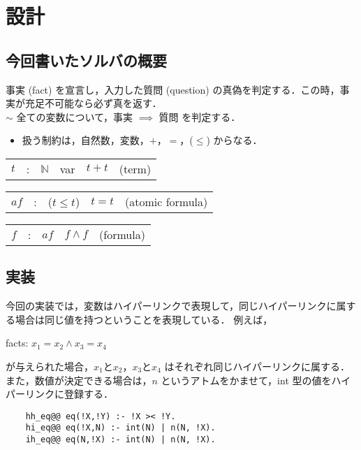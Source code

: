 \chapter{設計}
\section{今回書いたソルバの概要}
事実 (fact) を宣言し，入力した質問 (question) の真偽を判定する．この時，事実が充足不可能なら必ず真を返す．\\
$\sim$  全ての変数について，事実 $\implies$ 質問 を判定する．
\begin{itemize}
    \item 扱う制約は，自然数，変数，$+$，$=$，($\leq$) からなる．
\end{itemize}

\begin{table}[h]
    \centering
    \small
    \begin{tabular}{ccc|c|cr}
        $t$ & : & $\mathbb{N}$ & var & $t + t$ & (term)
    \end{tabular}
\end{table}

\begin{table}[h]
    \centering
    \small
    \begin{tabular}{ccc|cr}
        $af$ & : & ($t \leq t$) & $t=t$ & (atomic formula)
    \end{tabular}
\end{table}

\begin{table}[h]
    \centering
    \small
    \begin{tabular}{ccc|cr}
        $f$ & : & $af$ &$f \wedge f$ & (formula)
    \end{tabular}
\end{table}

\section{実装}
今回の実装では，変数はハイパーリンクで表現して，同じハイパーリンクに属する場合は同じ値を持つということを表現している．
例えば，
\begin{center}
    facts: $ x_1 = x_2 \wedge x_3 = x_4$\\
\end{center}
が与えられた場合，$x_1 と x_2$，$x_3 と x_4$ はそれぞれ同じハイパーリンクに属する．
また，数値が決定できる場合は，$ n $ というアトムをかませて，int 型の値をハイパーリンクに登録する．
\begin{lstlisting}
    hh_eq@@ eq(!X,!Y) :- !X >< !Y.
    hi_eq@@ eq(!X,N) :- int(N) | n(N, !X).
    ih_eq@@ eq(N,!X) :- int(N) | n(N, !X).
\end{lstlisting}

